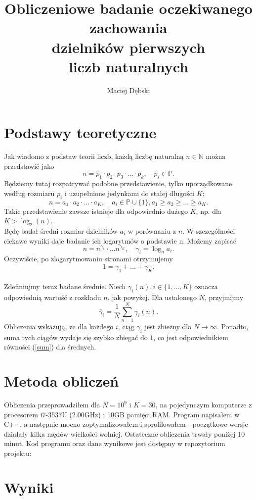 \documentclass{report}
\title{Obliczeniowe badanie oczekiwanego zachowania \\ dzielników pierwszych \\ liczb naturalnych}
\author{Maciej Dębski}
\newcommand{\N}{\mathbb{N}}
\renewcommand{\P}{\mathbb{P}}
\newcommand{\set}[1]{\{#1\}}
\begin{document}
\maketitle

\chapter*{Podstawy teoretyczne}
Jak wiadomo z podstaw teorii liczb, każdą liczbę naturalną $n \in \N$ można przedstawić jako
$$ n = p_1 \cdot p_2 \cdot p_3 \cdot \ldots \cdot p_k, \quad p_i \in \P. $$
Będziemy tutaj rozpatrywać podobne przedstawienie, tylko uporządkowane według rozmiaru $p_i$ i uzupełnione jedynkami do stałej długości $K$:
$$ n = a_1 \cdot a_2 \cdot \ldots \cdot a_K, \quad a_i \in \P \cup \set{1}, a_1 \geq a_2 \geq \ldots \geq a_K. $$
Takie przedstawienie zawsze istnieje dla odpowiednio dużego $K$, np. dla $K > \log_2(n)$. \\

Będę badał średni rozmiar dzielników $a_i$ w porównaniu z $n$. W szczególności ciekawe wyniki daje badanie ich logarytmów o podstawie n. Możemy zapisać
$$ n = n^{\gamma_1} \cdot \ldots n^{\gamma_K}, \quad \gamma_i = \log_n{a_i}. $$
Oczywiście, po zlogarytmowaniu stronami otrzymujemy
\begin{equation} \label{sum} 1 = \gamma_1 + \ldots + \gamma_K. \end{equation} \\

Zdefiniujmy teraz badane średnie. Niech $\gamma_i(n), i \in \set{1, \ldots, K}$ oznacza odpowiednią wartość z rozkładu $n$, jak powyżej. Dla ustalonego $N$, przyjmijmy
$$ \bar{\gamma}_i = \frac{1}{N} \sum_{n=1}^{N} \gamma_i(n). $$
Obliczenia wskazują, że dla każdego $i$, ciąg $\bar{\gamma}_i$ jest zbieżny dla $N \to \infty$. Ponadto, suma tych ciągów wydaje się szybko zbiegać do $1$,
co jest odpowiednikiem równości (\ref{sum}) dla średnych.

\chapter*{Metoda obliczeń}

Obliczenia przeprowadziłem dla $N = 10^9$ i $K = 30$, na pojedynczym komputerze z procesorem i7-3537U (2.00GHz) i 10GB pamięci RAM.
Program napisałem w C++, a następnie mocno zoptymalizowałem i sprofilowałem - początkowe wersje działały kilka rzędów wielkości wolniej.
Ostateczne obliczenia trwały poniżej 10 minut. Kod programu oraz dane wynikowe jest dostępny w repozytorium projektu:

\chapter*{Wyniki}
\end{document}
